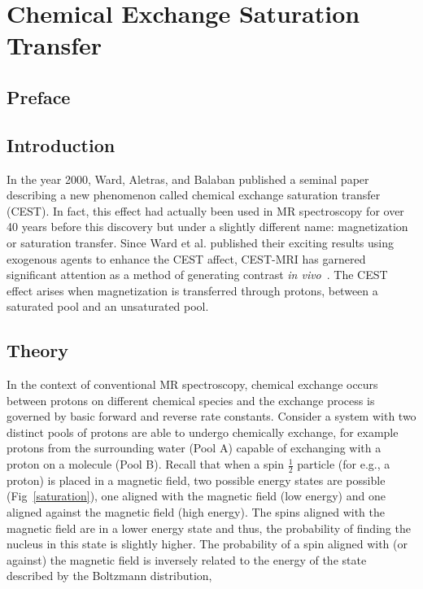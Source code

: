 
\chapter{Chemical Exchange Saturation Transfer}
\label{ch:CEST}

\section{Preface}

\section{Introduction}

In the year 2000, Ward, Aletras, and Balaban published a seminal paper describing a new phenomenon called chemical exchange saturation transfer (CEST).
In fact, this effect had actually been used in MR spectroscopy for over 40 years before this discovery but under a slightly different name: magnetization or saturation transfer.
Since Ward et al.
published their exciting results using exogenous agents to enhance the CEST affect, CEST-MRI has garnered significant attention as a method of generating contrast \emph{in vivo}~\cite{Sherry:2008jg}.
The CEST effect arises when magnetization is transferred through protons, between a saturated pool and an unsaturated pool.

\section{Theory}

In the context of conventional MR spectroscopy, chemical exchange occurs between protons on different chemical species and the exchange process is governed by basic forward and reverse rate constants.
Consider a system with two distinct pools of protons are able to undergo chemically exchange, for example protons from the surrounding water (Pool A) capable of exchanging with a proton on a molecule (Pool B).
Recall that when a spin $\frac{1}{2}$ particle (for e.g., a proton) is placed in a magnetic field, two possible energy states are possible (Fig~\ref{saturation}), one aligned with the magnetic field (low energy) and one aligned against the magnetic field (high energy).
The spins aligned with the magnetic field are in a lower energy state and thus, the probability of finding the nucleus in this state is slightly higher.
The probability of a spin aligned with (or against) the magnetic field is inversely related to the energy of the  state described by the Boltzmann distribution,

